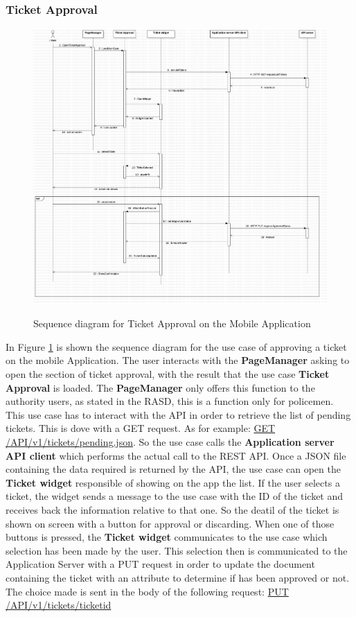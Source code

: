 \subsubsection{Ticket Approval}%
\begin{figure}[H]
\centering
\includegraphics[width=\textwidth]{Images/DDSeqAppTick.png}
\caption{\label{fig:DDSeqAppTick}} Sequence diagram for Ticket Approval on the Mobile Application
\end{figure}
In Figure \ref{fig:DDSeqAppTick} is shown the sequence diagram for the use case of approving a ticket on the mobile Application.
The user interacts with the \textbf{PageManager} asking to open the section of ticket approval, with the result that the use case \textbf{Ticket Approval} is loaded. The \textbf{PageManager} only offers this function to the authority users, as stated in the RASD, this is a function only for policemen. This use case has to interact with the API in order to retrieve the list of pending tickets. This is dove with a GET request. As for example: \url{GET} \url{/API/v1/tickets/pending.json}. So the use case calls the \textbf{Application server API client} which performs the actual call to the REST API. Once a JSON file containing the data required is returned by the API, the use case can open the \textbf{Ticket widget} responsible of showing on the app the list.
If the user selects a ticket, the widget sends a message to the use case with the ID of the ticket and receives back the information relative to that one. So the deatil of the ticket is shown on screen with a button for approval or discarding. When one of those buttons is pressed, the \textbf{Ticket widget} communicates to the use case which selection has been made by the user. This selection then is communicated to the Application Server with a PUT request in order to update the document containing the ticket with an attribute to determine if has been approved or not. The choice made is sent in the body of the following request: \url{PUT} \url{/API/v1/tickets/ticketid}


